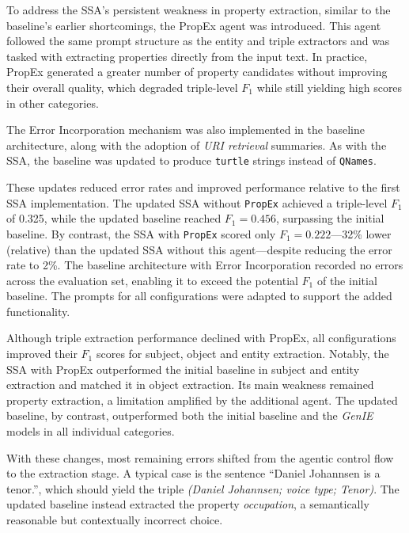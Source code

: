 \documentclass[a4paper,oneside,bibliography=totoc]{scrbook}
\begin{document}
To address the \ac{SSA}’s persistent weakness in property extraction, similar to the baseline’s earlier shortcomings, the \ac{PropEx} agent was introduced. This agent followed the same prompt structure as the entity and triple extractors and was tasked with extracting properties directly from the input text. In practice, \ac{PropEx} generated a greater number of property candidates without improving their overall quality, which degraded triple-level $F_{1}$ while still yielding high scores in other categories.

The Error Incorporation mechanism was also implemented in the baseline architecture, along with the adoption of \textit{URI retrieval} summaries. As with the \ac{SSA}, the baseline was updated to produce \texttt{turtle} strings instead of \texttt{QNames}.

These updates reduced error rates and improved performance relative to the first \ac{SSA} implementation. The updated \ac{SSA} without \texttt{PropEx} achieved a triple-level $F_{1}$ of 0.325, while the updated baseline reached $F_{1}=0.456$, surpassing the initial baseline. By contrast, the \ac{SSA} with \texttt{PropEx} scored only $F_{1}=0.222$—32\% lower (relative) than the updated \ac{SSA} without this agent—despite reducing the error rate to 2\%. The baseline architecture with Error Incorporation recorded no errors across the evaluation set, enabling it to exceed the potential $F_{1}$ of the initial baseline. The prompts for all configurations were adapted to support the added functionality.

Although triple extraction performance declined with \ac{PropEx}, all configurations improved their $F_{1}$ scores for subject, object and entity extraction. Notably, the \ac{SSA} with \ac{PropEx} outperformed the initial baseline in subject and entity extraction and matched it in object extraction. Its main weakness remained property extraction, a limitation amplified by the additional agent. The updated baseline, by contrast, outperformed both the initial baseline and the \textit{GenIE} models in all individual categories.

With these changes, most remaining errors shifted from the agentic control flow to the extraction stage. A typical case is the sentence \enquote{Daniel Johannsen is a tenor.}, which should yield the triple \textit{(Daniel Johannsen; voice type; Tenor)}. The updated baseline instead extracted the property \textit{occupation}, a semantically reasonable but contextually incorrect choice.
\end{document}
